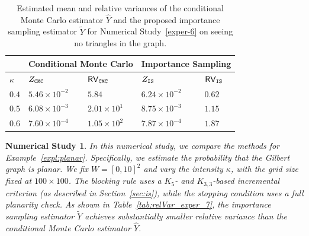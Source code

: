 \documentclass[pdflatex, sn-mathphys-ay]{sn-jnl}%
\newcommand{\wt}{\widetilde}
\newcommand{\wh}{\widehat}
\newtheorem{experiment}{Numerical Study}
\theoremstyle{thmstyleone}%
\theoremstyle{thmstyletwo}%
\theoremstyle{thmstylethree}%
\begin{document}
\begin{table}[h]
 
\caption{Estimated mean and relative variances of the conditional Monte Carlo estimator $\wh Y$ and the proposed importance sampling estimator $\wt Y$ for Numerical Study~\ref{exper-6} on seeing no triangles in the graph.}
\label{tab:relVar_exper_6}
\centering
\begin{tabular}{@{}lllll@{}}
    \hline
      & \multicolumn{2}{l}{Conditional Monte Carlo}
            & \multicolumn{2}{l}{Importance Sampling} \\
    \hline
     $\kappa$  &  $Z_{\tt CMC}$  &  ${\sf RV}_{\tt CMC}$   &   $Z_{\tt IS}$  &  ${\sf RV}_{\tt IS}$ \\
    \hline
$0.4$  &  $5.46 \times 10^{-2}$  &  $5.84$  &  $6.24 \times 10^{-2}$  &  $0.62$  \\
    \hline
$0.5$  &  $6.08 \times 10^{-3}$  &  $2.01 \times 10^{1}$  &  $8.75 \times 10^{-3}$  &  $1.15$  \\
    \hline
$0.6$  &  $7.60 \times 10^{-4}$  &  $1.05 \times 10^{2}$  &  $7.87 \times 10^{-4}$  &  $1.87$  \\
    \hline
\end{tabular}
\end{table}

\begin{experiment}
 
\label{exper-7}
\normalfont
In this numerical study, we compare the methods for Example~\ref{expl:planar}. Specifically, we estimate the probability that the Gilbert graph is planar. We fix $W = [0, 10]^2$ and vary the intensity $\kappa$, with the grid size fixed at $100 \times 100$. The blocking rule uses a $K_5$- and $K_{3,3}$-based incremental criterion (as described in Section~\ref{sec:is}), while the stopping condition uses a full planarity check. As shown in Table~\ref{tab:relVar_exper_7}, the importance sampling estimator $\wt Y$ achieves substantially smaller relative variance than the conditional Monte Carlo estimator $\wh Y$.
\end{experiment}
\end{document}

